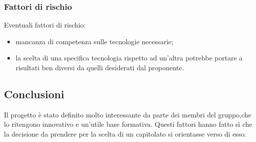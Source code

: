 		\subsubsection {Fattori di rischio}
		Eventuali fattori di rischio:
			\begin {itemize}
				\item mancanza di competenza sulle tecnologie necessarie;
				\item la scelta di una specifica tecnologia rispetto ad un'altra potrebbe portare a risultati ben diversi da quelli desiderati dal proponente.
			\end {itemize}
	\subsection {Conclusioni}
	Il progetto è stato definito molto interessante da parte dei membri del gruppo,che lo ritengono innovativo e un'utile base formativa. Questi fattori hanno fatto sì che la decisione da prendere per la scelta di un capitolato si orientasse verso di esso.
